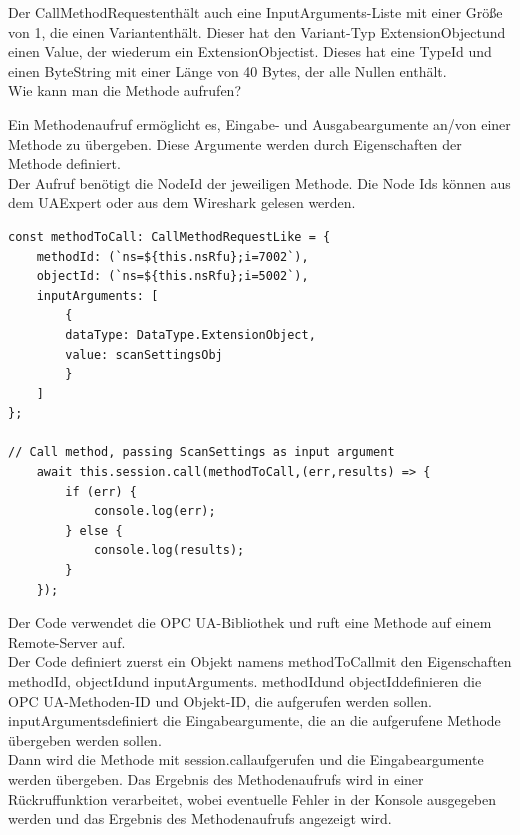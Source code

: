 Der \dq CallMethodRequest\dq  enthält auch eine \dq InputArguments\dq -Liste mit einer Größe von 1, die einen \dq Variant\dq  enthält. Dieser hat den Variant-Typ \dq ExtensionObject\dq  und einen \dq Value\dq , der wiederum ein \dq ExtensionObject\dq  ist. Dieses hat eine TypeId und einen ByteString mit einer Länge von 40 Bytes, der alle Nullen enthält.\\

Wie kann man die Methode aufrufen?

Ein Methodenaufruf ermöglicht es, Eingabe- und Ausgabeargumente an/von einer Methode zu übergeben. Diese Argumente werden durch Eigenschaften der Methode definiert.\\

Der Aufruf benötigt die NodeId der jeweiligen Methode. Die Node Ids können aus dem UAExpert oder aus dem Wireshark gelesen werden.
\begin{lstlisting}[style=JavaScript, caption={Methodenaufruf StartScan}]
const methodToCall: CallMethodRequestLike = {
    methodId: (`ns=${this.nsRfu};i=7002`),
    objectId: (`ns=${this.nsRfu};i=5002`),
    inputArguments: [
        {
        dataType: DataType.ExtensionObject,
        value: scanSettingsObj
        }
    ]
};

// Call method, passing ScanSettings as input argument
    await this.session.call(methodToCall,(err,results) => {
        if (err) {
            console.log(err);
        } else {
            console.log(results);
        }
    });
\end{lstlisting}

Der Code verwendet die OPC UA-Bibliothek und ruft eine Methode auf einem Remote-Server auf.\\

Der Code definiert zuerst ein Objekt namens \dq methodToCall\dq  mit den Eigenschaften \dq methodId\dq , \dq objectId\dq  und \dq inputArguments\dq . \dq methodId\dq  und \dq objectId\dq  definieren die OPC UA-Methoden-ID und Objekt-ID, die aufgerufen werden sollen. \dq inputArguments\dq  definiert die Eingabeargumente, die an die aufgerufene Methode übergeben werden sollen.\\

Dann wird die Methode mit \dq session.call\dq  aufgerufen und die Eingabeargumente werden übergeben. Das Ergebnis des Methodenaufrufs wird in einer Rückruffunktion verarbeitet, wobei eventuelle Fehler in der Konsole ausgegeben werden und das Ergebnis des Methodenaufrufs angezeigt wird.

